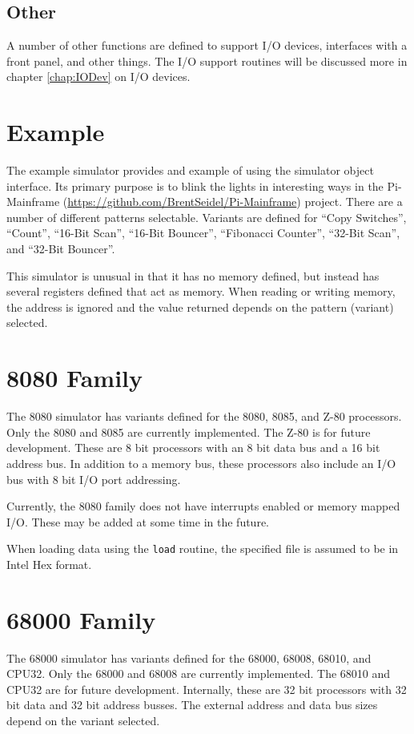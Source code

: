 \documentclass[10pt, openany]{book}
\begin{document}
\subsection{Other}
A number of other functions are defined to support I/O devices, interfaces with a front panel, and other things.  The I/O support routines will be discussed more in chapter \ref{chap:IODev} on I/O devices.
\section{Example}
The example simulator provides and example of using the simulator object interface.  Its primary purpose is to blink the lights in interesting ways in the Pi-Mainframe (\url{https://github.com/BrentSeidel/Pi-Mainframe}) project.  There are a number of different patterns selectable.  Variants are defined for ``Copy Switches'', ``Count'', ``16-Bit Scan'', ``16-Bit Bouncer'', ``Fibonacci Counter'', ``32-Bit Scan'', and ``32-Bit Bouncer''.

This simulator is unusual in that it has no memory defined, but instead has several registers defined that act as memory.  When reading or writing memory, the address is ignored and the value returned depends on the pattern (variant) selected.

\section{8080 Family}
The 8080 simulator has variants defined for the 8080, 8085, and Z-80 processors.  Only the 8080 and 8085 are currently implemented.  The Z-80 is for future development.  These are 8 bit processors with an 8 bit data bus and a 16 bit address bus.  In addition to a memory bus, these processors also include an I/O bus with 8 bit I/O port addressing.

Currently, the 8080 family does not have interrupts enabled or memory mapped I/O.  These may be added at some time in the future.

When loading data using the \verb|load| routine, the specified file is assumed to be in Intel Hex format.

\section{68000 Family}
The 68000 simulator has variants defined for the 68000, 68008, 68010, and CPU32.  Only the 68000 and 68008 are currently implemented.  The 68010 and CPU32 are for future development.  Internally, these are 32 bit processors with 32 bit data and 32 bit address busses.  The external address and data bus sizes depend on the variant selected.
\end{document}
